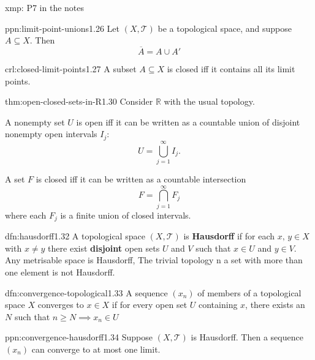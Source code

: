 \documentclass[landscape, 8pt]{extarticle}
\begin{document}
\begin{multicols}{3}
\begin{xmp}{xmp:}{}
	P7 in the notes
\end{xmp}

\begin{ppn}{ppn:limit-point-unions}{1.26}
	Let $(X, \mathcal{T})$ be a topological space, and suppose $A \subseteq X$. Then
	\[\overline{A} = A \cup A'\]
\end{ppn}

\begin{crl}[]{crl:closed-limit-points}{1.27}
	A subset $A \subseteq X$ is closed iff it contains all its limit points.
\end{crl}

\begin{thm}{thm:open-closed-sets-in-R}{1.30}
Consider $\mathbb{R}$ with the usual topology.
\begin{enumerate-zero}
\item A nonempty set $U$ is open iff it can be written as a countable union of disjoint nonempty open intervals $I_{j}$:
\[U = \bigcup_{j=1}^{\infty} I_{j}.\]
\item A set $F$ is closed iff it can be written as a countable intersection
\[F = \bigcap_{j=1}^{\infty} F_{j}\]
where each $F_{j}$ is a finite union of closed intervals.
\end{enumerate-zero}
\end{thm}

\begin{dfn}{dfn:hausdorff}{1.32}
	A topological space $(X, \mathcal{T})$ is \textbf{Hausdorff} if for each $x,\,y\in X$ with $x \ne y$ there exist \textbf{disjoint} open sets $U$ and $V$ such that $x\in U$ and $y\in V$.
	\longrule{0.08ex}
	Any metrisable space is Hausdorff, The trivial topology n a set with more than one element is not Hausdorff.
\end{dfn}

\begin{dfn}{dfn:convergence-topological}{1.33}
	A sequence $(x_{n})$ of members of a topological space $X$ converges to $x\in X$ if for every open set $U$ containing $x$, there exists an $N$ such that $n \ge N \implies x_{n} \in U$
\end{dfn}

\begin{ppn}{ppn:convergence-hausdorff}{1.34}
	Suppose $(X, \mathcal{T})$ is Hausdorff. Then a sequence $(x_{n})$ can converge to at most one limit.
\end{ppn}


\end{multicols}
\end{document}
